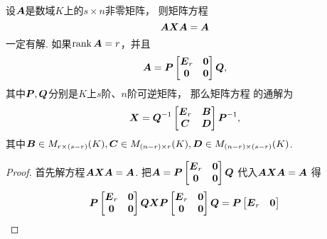 \begin{theorem}[广义逆存在定理]\label{theorem:线性方程组.广义逆1}
设\(\boldsymbol{A}\)是数域\(K\)上的\(s \times n\)非零矩阵，
则矩阵方程\begin{equation}\label{equation:线性方程组.广义逆1矩阵方程}
	\boldsymbol{A} \boldsymbol{X} \boldsymbol{A} = \boldsymbol{A}
\end{equation}一定有解.
如果\(\rank\boldsymbol{A}=r\)，并且\begin{equation*}
	\boldsymbol{A}
	= \boldsymbol{P}
	\begin{bmatrix}
		\boldsymbol{E}_r & \boldsymbol0 \\
		\boldsymbol0 & \boldsymbol0
	\end{bmatrix}
	\boldsymbol{Q},
\end{equation*}
其中\(\boldsymbol{P},\boldsymbol{Q}\)分别是\(K\)上\(s\)阶、\(n\)阶可逆矩阵，
那么矩阵方程  的通解为
\begin{equation}\label{equation:线性方程组.广义逆1矩阵方程的通解}
	\boldsymbol{X}
	= \boldsymbol{Q}^{-1}
	\begin{bmatrix}
		\boldsymbol{E}_r & \boldsymbol{B} \\
		\boldsymbol{C} & \boldsymbol{D}
	\end{bmatrix}
	\boldsymbol{P}^{-1},
\end{equation}
其中\(\boldsymbol{B}\in M_{r\times(s-r)}(K),
\boldsymbol{C}\in M_{(n-r)\times r}(K),
\boldsymbol{D}\in M_{(n-r)\times(s-r)}(K)\).
\begin{proof}
首先解方程\(\boldsymbol{A} \boldsymbol{X} \boldsymbol{A} = \boldsymbol{A}\).
把\(
	\boldsymbol{A}
	= \boldsymbol{P}
	\begin{bmatrix}
		\boldsymbol{E}_r & \boldsymbol0 \\
		\boldsymbol0 & \boldsymbol0
	\end{bmatrix}
	\boldsymbol{Q}
\)
代入\(\boldsymbol{A} \boldsymbol{X} \boldsymbol{A} = \boldsymbol{A}\)
得\begin{equation*}
	\boldsymbol{P}
	\begin{bmatrix}
		\boldsymbol{E}_r & \boldsymbol0 \\
		\boldsymbol0 & \boldsymbol0
	\end{bmatrix}
	\boldsymbol{Q} \boldsymbol{X} \boldsymbol{P}
	\begin{bmatrix}
		\boldsymbol{E}_r & \boldsymbol0 \\
		\boldsymbol0 & \boldsymbol0
	\end{bmatrix}
	\boldsymbol{Q}
	= \boldsymbol{P}
	\begin{bmatrix}
		\boldsymbol{E}_r & \boldsymbol0 \\

\end{bmatrix}
\end{equation*}
\end{proof}
\end{theorem}
